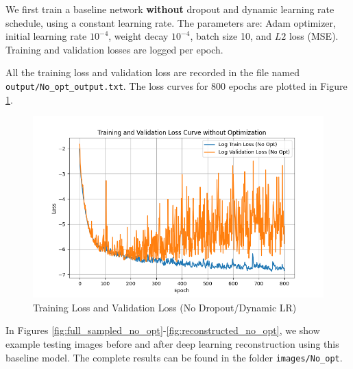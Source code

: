 \documentclass{article}
\begin{document}
We first train a baseline network \textbf{without} dropout and dynamic learning rate schedule, using a constant learning rate. The parameters are: Adam optimizer, initial learning rate $10^{-4}$, weight decay $10^{-4}$, batch size 10, and $L2$ loss (MSE). Training and validation losses are logged per epoch.

All the training loss and validation loss are recorded in the file named \texttt{output/No\_opt\_output.txt}.
The loss curves for 800 epochs are plotted in Figure \ref{fig:loss_no_opt}.
\begin{figure}[H]
  \centering
  \includegraphics[width=0.7\linewidth]{../assets/Training Loss and Validation Loss No opt.png}
  \caption{Training Loss and Validation Loss (No Dropout/Dynamic LR)}
  \label{fig:loss_no_opt}
\end{figure}

In Figures \ref{fig:full_sampled_no_opt}-\ref{fig:reconstructed_no_opt}, we show example testing images before and after deep learning reconstruction using this baseline model. The complete results can be found in the folder \texttt{images/No\_opt}.
\end{document}
